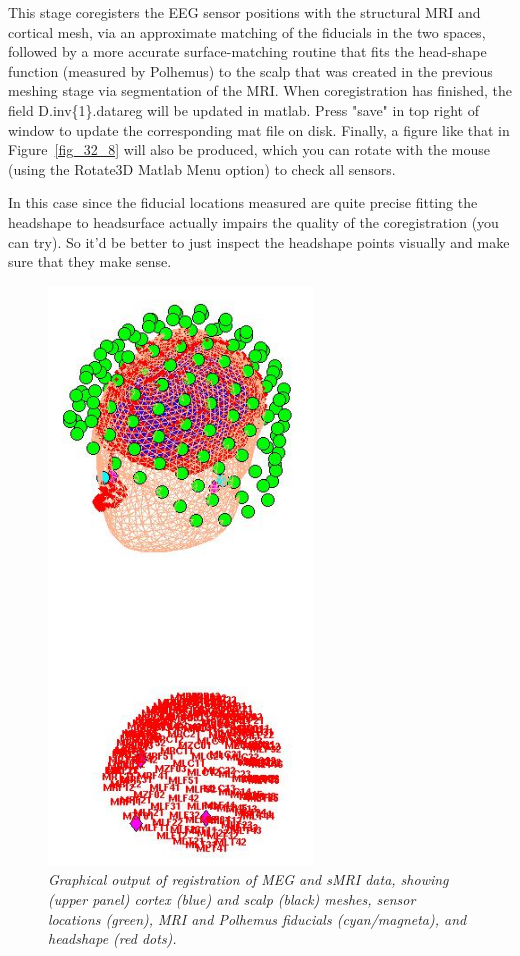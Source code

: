 This stage coregisters the EEG sensor positions with the structural MRI and cortical mesh, via an approximate matching of the fiducials in the two spaces, followed by a more accurate surface-matching routine that fits the head-shape function (measured by Polhemus) to the scalp that was created in the previous meshing stage via segmentation of the MRI. When coregistration has finished, the field D.inv\{1\}.datareg will be updated in matlab. Press "save" in top right of window to update the corresponding mat file on disk. Finally, a figure like that in Figure~\ref{fig_32_8} will also be produced, which you can rotate with the mouse (using the Rotate3D Matlab Menu option) to check all sensors.

In this case since the fiducial locations measured are quite precise fitting the headshape to headsurface actually impairs the quality of the coregistration (you can try). So it'd be better to just inspect the headshape points visually and make sure that they make sense.


\begin{figure}
\begin{center}
\includegraphics[width=70mm]{multimodal/figures/figure_32_17}
\caption{\em  Graphical output of registration of MEG and sMRI data, showing (upper panel) cortex (blue) and scalp (black) meshes, sensor locations (green), MRI and Polhemus fiducials (cyan/magneta), and headshape (red dots).\label{fig_32_17}}
\end{center}
\end{figure}


